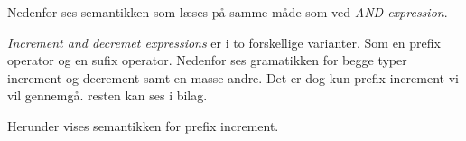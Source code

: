 Nedenfor ses semantikken som læses på samme måde som ved \textit{AND expression}.



\textit{Increment and decremet expressions} er i to forskellige varianter. Som en prefix operator og en sufix operator. Nedenfor ses gramatikken for begge typer increment og decrement samt en masse andre. Det er dog kun prefix increment vi vil gennemgå. resten kan ses i bilag.


Herunder vises semantikken for prefix increment.

